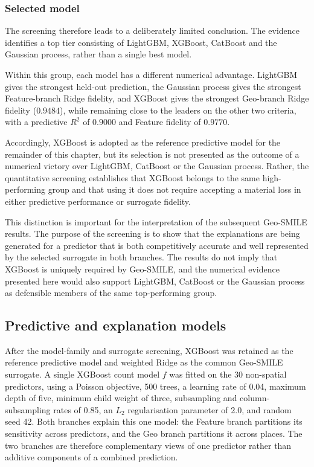\subsubsection{Selected model}
\label{sec}

The screening therefore leads to a deliberately limited conclusion. The evidence identifies a top tier consisting of LightGBM, XGBoost, CatBoost and the Gaussian process, rather than a single best model.

Within this group, each model has a different numerical advantage. LightGBM gives the strongest held-out prediction, the Gaussian process gives the strongest Feature-branch Ridge fidelity, and XGBoost gives the strongest Geo-branch Ridge fidelity ($0.9484$), while remaining close to the leaders on the other two criteria, with a predictive $R^2$ of $0.9000$ and Feature fidelity of $0.9770$.

Accordingly, XGBoost is adopted as the reference predictive model for the remainder of this chapter, but its selection is not presented as the outcome of a numerical victory over LightGBM, CatBoost or the Gaussian process. Rather, the quantitative screening establishes that XGBoost belongs to the same high-performing group and that using it does not require accepting a material loss in either predictive performance or surrogate fidelity.

This distinction is important for the interpretation of the subsequent Geo-SMILE results. The purpose of the screening is to show that the explanations are being generated for a predictor that is both competitively accurate and well represented by the selected surrogate in both branches. The results do not imply that XGBoost is uniquely required by Geo-SMILE, and the numerical evidence presented here would also support LightGBM, CatBoost or the Gaussian process as defensible members of the same top-performing group.



\subsection{Predictive and explanation models}
\label{sec:hull_models}

After the model-family and surrogate screening, XGBoost was retained as the reference predictive model and weighted Ridge as the common Geo-SMILE surrogate. A single XGBoost count model $f$ was fitted on the 30 non-spatial predictors, using a Poisson objective, 500 trees, a learning rate of 0.04, maximum depth of five, minimum child weight of three, subsampling and column-subsampling rates of 0.85, an $L_2$ regularisation parameter of 2.0, and random seed 42. Both branches explain this one model: the Feature branch partitions its sensitivity across predictors, and the Geo branch partitions it across places. The two branches are therefore complementary views of one predictor rather than additive components of a combined prediction.

